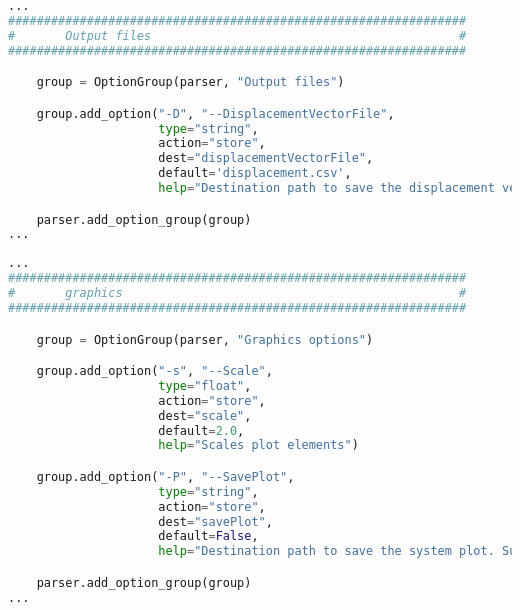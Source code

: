 \begin{inconsolata}
\begin{minipage}{\linewidth}
\begin{lstlisting}[language=python]
...
################################################################
#       Output files                                           #
################################################################

    group = OptionGroup(parser, "Output files")

    group.add_option("-D", "--DisplacementVectorFile",
                     type="string",
                     action="store",
                     dest="displacementVectorFile",
                     default='displacement.csv',
                     help="Destination path to save the displacement vector csv file")

    parser.add_option_group(group)
...
\end{lstlisting}
\end{minipage}
\end{inconsolata}

\begin{inconsolata}
\begin{minipage}{\linewidth}
\begin{lstlisting}[language=python]
...
################################################################
#       graphics                                               #
################################################################

    group = OptionGroup(parser, "Graphics options")

    group.add_option("-s", "--Scale",
                     type="float",
                     action="store",
                     dest="scale",
                     default=2.0,
                     help="Scales plot elements")

    group.add_option("-P", "--SavePlot",
                     type="string",
                     action="store",
                     dest="savePlot",
                     default=False,
                     help="Destination path to save the system plot. Supported filetypes: .png, .pdf")

    parser.add_option_group(group)
...
\end{lstlisting}
\end{minipage}
\end{inconsolata}

